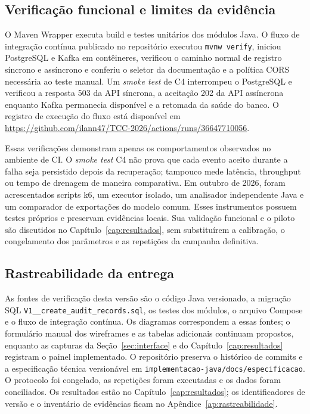 \subsection{Verificação funcional e limites da evidência}
\label{sec:validacao-funcional}
O Maven Wrapper executa build e testes unitários dos módulos Java. O fluxo de integração contínua publicado no repositório executou \texttt{mvnw verify}, iniciou PostgreSQL e Kafka em contêineres, verificou o caminho normal de registro síncrono e assíncrono e conferiu o seletor da documentação e a política CORS necessária ao teste manual. Um \textit{smoke test} de C4 interrompeu o PostgreSQL e verificou a resposta 503 da API síncrona, a aceitação 202 da API assíncrona enquanto Kafka permanecia disponível e a retomada da saúde do banco. O registro de execução do fluxo está disponível em \url{https://github.com/ilann47/TCC-2026/actions/runs/36647710056}.

Essas verificações demonstram apenas os comportamentos observados no ambiente de CI. O \textit{smoke test} C4 não prova que cada evento aceito durante a falha seja persistido depois da recuperação; tampouco mede latência, throughput ou tempo de drenagem de maneira comparativa. Em outubro de 2026, foram acrescentados scripts k6, um executor isolado, um analisador independente Java e um comparador de exportações do modelo comum. Esses instrumentos possuem testes próprios e preservam evidências locais. Sua validação funcional e o piloto são discutidos no Capítulo~\ref{cap:resultados}, sem substituírem a calibração, o congelamento dos parâmetros e as repetições da campanha definitiva.

\subsection{Rastreabilidade da entrega}
\label{sec:evidencias}
As fontes de verificação desta versão são o código Java versionado, a migração SQL \texttt{V1\_\_create\_audit\_records.sql}, os testes dos módulos, o arquivo Compose e o fluxo de integração contínua. Os diagramas correspondem a essas fontes; o formulário manual dos wireframes e as tabelas adicionais continuam propostos, enquanto as capturas da Seção~\ref{sec:interface} e do Capítulo~\ref{cap:resultados} registram o painel implementado. O repositório preserva o histórico de commits e a especificação técnica versionável em \texttt{implementacao-java/docs/especificacao}. O protocolo foi congelado, as repetições foram executadas e os dados foram conciliados. Os resultados estão no Capítulo~\ref{cap:resultados}; os identificadores de versão e o inventário de evidências ficam no Apêndice~\ref{ap:rastreabilidade}.
